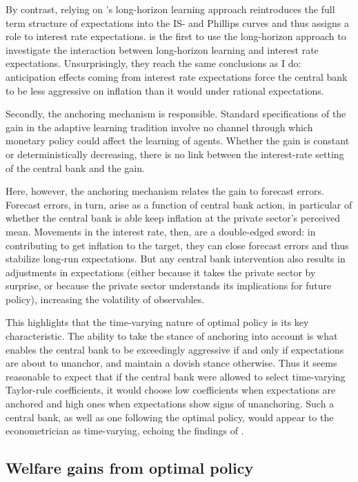 \documentclass[11pt]{article}
\renewcommand{\[}{\begin{equation}}
\renewcommand{\]}{\end{equation}}
\begin{document}
By contrast, relying on \cite{preston2005}'s long-horizon learning approach reintroduces the full term structure of expectations into the IS- and Phillips curves and thus assigns a role to interest rate expectations. \cite{eusepi2018limits} is the first to use the long-horizon approach to investigate the interaction between long-horizon learning and interest rate expectations. Unsurprisingly, they reach the same conclusions as I do: anticipation effects coming from interest rate expectations force the central bank to be less aggressive on inflation than it would under rational expectations.

Secondly, the anchoring mechanism is responsible. Standard specifications of the gain in the adaptive learning tradition involve no channel through which monetary policy could affect the learning of agents. Whether the gain is constant or deterministically decreasing, there is no link between the interest-rate setting of the central bank and the gain. 

Here, however, the anchoring mechanism relates the gain to forecast errors. Forecast errors, in turn, arise as a function of central bank action, in particular of whether the central bank is able keep inflation at the private sector's perceived mean. Movements in the interest rate, then, are a double-edged sword: in contributing to get inflation to the target, they can close forecast errors and thus stabilize long-run expectations. But any central bank intervention also results in adjustments in expectations (either because it takes the private sector by surprise, or because the private sector understands its implications for future policy), increasing the volatility of observables.

This highlights that the time-varying nature of optimal policy is its key characteristic. The ability to take the stance of anchoring into account is what enables the central bank to be exceedingly aggressive if and only if expectations are about to unanchor, and maintain a dovish stance otherwise. Thus it seems reasonable to expect that if the central bank were allowed to select time-varying Taylor-rule coefficients, it would choose low coefficients when expectations are anchored and high ones when expectations show signs of unanchoring. Such a central bank, as well as one following the optimal policy, would appear to the econometrician as time-varying, echoing the findings of \cite{LUBIK201685}.


\subsection{Welfare gains from optimal policy}\label{welfare}
\end{document}
